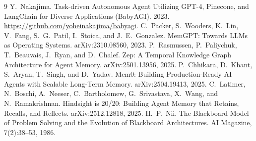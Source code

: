\documentclass[11pt]{article}
\begin{document}
\begin{thebibliography}{9}
\small
{} Y.~Nakajima. Task-driven Autonomous Agent Utilizing GPT-4, Pinecone, and LangChain for Diverse Applications (BabyAGI). 2023. \url{https://github.com/yoheinakajima/babyagi}.
 C.~Packer, S.~Wooders, K.~Lin, V.~Fang, S.~G.~Patil, I.~Stoica, and J.~E.~Gonzalez. MemGPT: Towards LLMs as Operating Systems. arXiv:2310.08560, 2023.
 P.~Rasmussen, P.~Paliychuk, T.~Beauvais, J.~Ryan, and D.~Chalef. Zep: A Temporal Knowledge Graph Architecture for Agent Memory. arXiv:2501.13956, 2025.
 P.~Chhikara, D.~Khant, S.~Aryan, T.~Singh, and D.~Yadav. Mem0: Building Production-Ready AI Agents with Scalable Long-Term Memory. arXiv:2504.19413, 2025.
 C.~Latimer, N.~Boschi, A.~Neeser, C.~Bartholomew, G.~Srivastava, X.~Wang, and N.~Ramakrishnan. Hindsight is 20/20: Building Agent Memory that Retains, Recalls, and Reflects. arXiv:2512.12818, 2025.
 H.~P.~Nii. The Blackboard Model of Problem Solving and the Evolution of Blackboard Architectures. AI Magazine, 7(2):38--53, 1986.
\end{thebibliography}
\end{document}
